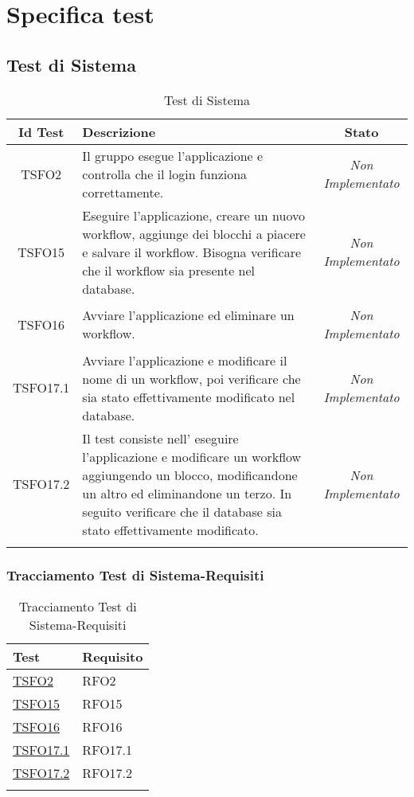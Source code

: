 \chapter{Specifica test}
\label{test}
\section{Test di Sistema}
\normalsize
\begin{longtable}{|c|>{}m{8cm}|c|}
\hline 
\textbf{Id Test} & \textbf{Descrizione} & \textbf{Stato}\\
\hline
\endhead
\hypertarget{TSFO2}{TSFO2} & Il gruppo esegue l'applicazione e controlla che il login funziona correttamente. & \textit{Non Implementato}\\ \hline
\hypertarget{TSFO15}{TSFO15} & Eseguire l'applicazione, creare un nuovo workflow, aggiunge dei blocchi a piacere e salvare il workflow. Bisogna verificare che il workflow sia presente nel database. & \textit{Non Implementato}\\ \hline
\hypertarget{TSFO16}{TSFO16} & Avviare l'applicazione ed eliminare un workflow. & \textit{Non Implementato}\\ \hline
\hypertarget{TSFO17.1}{TSFO17.1} & Avviare l'applicazione e modificare il nome di un workflow, poi verificare che sia stato effettivamente modificato nel database. & \textit{Non Implementato}\\ \hline
\hypertarget{TSFO17.2}{TSFO17.2} & Il test consiste nell' eseguire l'applicazione e modificare un workflow aggiungendo un blocco, modificandone un altro ed eliminandone un terzo. In seguito verificare che il database sia stato effettivamente modificato. & \textit{Non Implementato}\\ \hline
\caption[Test di Sistema]{Test di Sistema}
\label{tabella:test1}
\end{longtable}
\clearpage
\subsection{Tracciamento Test di Sistema-Requisiti}
\normalsize
\begin{longtable}{|>{\centering}m{5cm}|m{5cm}<{\centering}|}
\hline
\textbf{Test} & \textbf{Requisito}\\
\hline
\endhead
\hyperlink{TSFO2}{TSFO2} & RFO2\\ \hline
\hyperlink{TSFO15}{TSFO15} & RFO15\\ \hline
\hyperlink{TSFO16}{TSFO16} & RFO16\\ \hline
\hyperlink{TSFO17.1}{TSFO17.1} & RFO17.1\\ \hline
\hyperlink{TSFO17.2}{TSFO17.2} & RFO17.2\\ \hline
\caption[Tracciamento Test di Sistema-Requisiti]{Tracciamento Test di Sistema-Requisiti}
\label{tabella:ts-requi}
\end{longtable}
\clearpage



